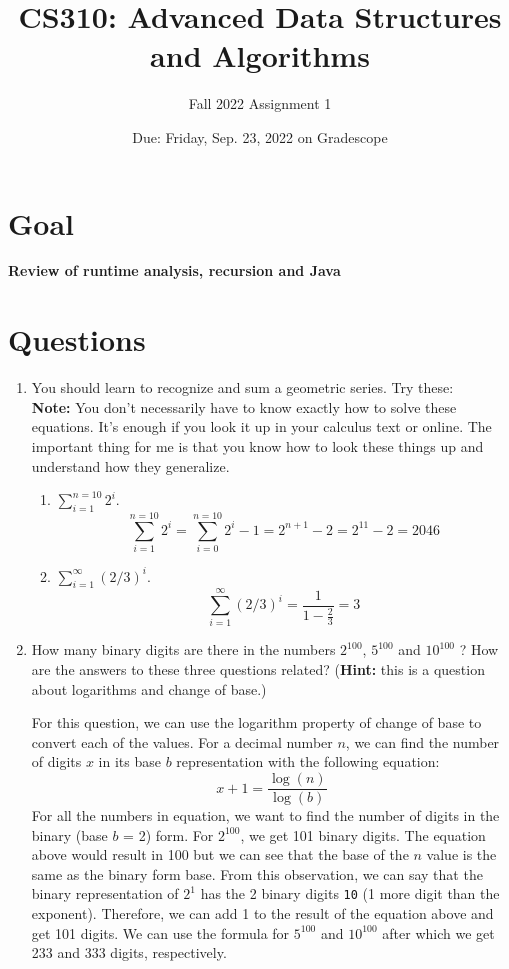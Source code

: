 \documentclass[letterpaper, 11pt]{article}
\title{CS310: Advanced Data Structures and Algorithms}
\author{Fall 2022 Assignment 1}
\date{Due: Friday, Sep. 23, 2022 on Gradescope}
\begin{document}
\maketitle

\section*{Goal}

\textbf{Review of runtime analysis, recursion and Java}

\section*{Questions}

\begin{enumerate}[leftmargin=*]
    \item You should learn to recognize and sum a geometric series. Try these:\\
    \textbf{Note:} You don't necessarily have to know exactly how to solve these equations. It's enough if you look it up in your calculus text or online. The important thing for me is that you know how to look these things up and understand how they generalize.

    \begin{enumerate}
        \item $\displaystyle\sum_{i=1}^{n=10} 2^{i}$.
        \[\sum_{i=1}^{n=10} 2^{i} = \sum_{i=0}^{n=10} 2^{i} - 1 = 2^{n+1} - 2 = 2^{11} - 2 = 2046\]
        
        \item $\displaystyle\sum_{i=1}^{\infty} (2/3)^i$.
        \[\sum_{i=1}^{\infty} (2/3)^i = \frac{1}{1-\frac{2}{3}} = 3\]
    \end{enumerate}

    \item How many binary digits are there in the numbers $2^{100}$, $5^{100}$ and $10^{100}$ ? How are the answers to these three questions related? (\textbf{Hint:} this is a question about logarithms and change of base.)

    For this question, we can use the logarithm property of change of base to convert each of the values. For a decimal number $n$, we can find the number of digits $x$ in its base $b$ representation with the following equation:
    \[x + 1 = \frac{\log({n})}{\log({b})}\]
    For all the numbers in equation, we want to find the number of digits in the binary (base $b$ = 2) form. For $2^{100}$, we get 101 binary digits. The equation above would result in 100 but we can see that the base of the $n$ value is the same as the binary form base. From this observation, we can say that the binary representation of $2^1$ has the 2 binary digits \texttt{10} (1 more digit than the exponent). Therefore, we can add 1 to the result of the equation above and get 101 digits. We can use the formula for $5^{100}$ and $10^{100}$ after which we get 233 and 333 digits, respectively. 



\end{enumerate}
\end{document}
